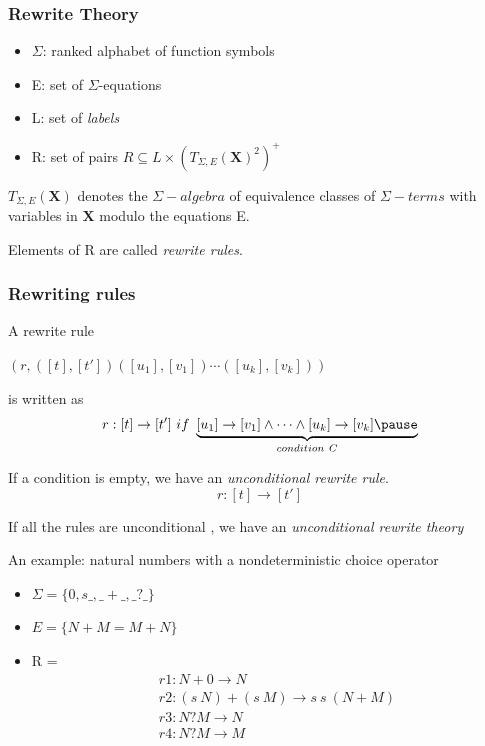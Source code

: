 \documentclass{beamer}
\begin{document}
\begin{frame}
    \frametitle{Rewrite Theory}
    \begin{center}
    \end{center}
    
    \bigskip
    \begin{itemize}
        \pause
        \item $\Sigma$: ranked alphabet of function symbols
        \pause
        \item E: set  of $\Sigma$-equations 
        \pause
        \item L: set of \emph{labels}
        \pause
        \item R: set of pairs $R \subseteq L \times (T_{\Sigma, E}(\mathbf{X})^2)^+$
    \end{itemize}
    
    \pause
    \bigskip
    $T_{\Sigma,E}(\mathbf{X})$ denotes the $\Sigma-algebra$ of equivalence classes of $\Sigma-terms$ with variables in $\mathbf{X}$ modulo the equations E.
    
    \medskip
    Elements of R are called \emph{rewrite rules}.
\end{frame}
\begin{frame}
    \frametitle{Rewriting rules}
    A rewrite rule 
    \begin{center}
        $(r,([t],[t'])([u_1],[v_1])\cdots([u_k],[v_k]))$
    \end{center}
    is written as 
    $$
    r:[t] \rightarrow [t']\ if\ \underbrace{[u_1]\rightarrow[v_1] \wedge \cdots \wedge [u_k] \rightarrow [v_k] \pause}_{condition\ C}
    $$
    
    \bigskip
    \pause
    If a condition is empty, we have an \emph{unconditional rewrite rule}.
    $$
    r:[t] \rightarrow [t']
    $$
    

    If all the rules are unconditional , we have an \emph{unconditional rewrite theory}
\end{frame}
\begin{frame}

    An example: natural numbers with a nondeterministic choice operator 
    
    \pause
    \begin{itemize}
        \item $\Sigma = \{0,s\_,\_+\_,\_?\_\}$
        \pause
        \item $E = \{N + M = M + N\}$
        \pause
        \item R = 
            \vspace{-5mm}
            \begin{align*}
                &r1: N+0 \rightarrow N \\ 
                &r2: (s\ N) + (s\ M) \rightarrow s\ s\ (N + M) \\ 
                &r3: N ? M \rightarrow N \\ 
                &r4: N ? M \rightarrow M 
            \end{align*}
    \end{itemize}
\end{frame}
\end{document}
